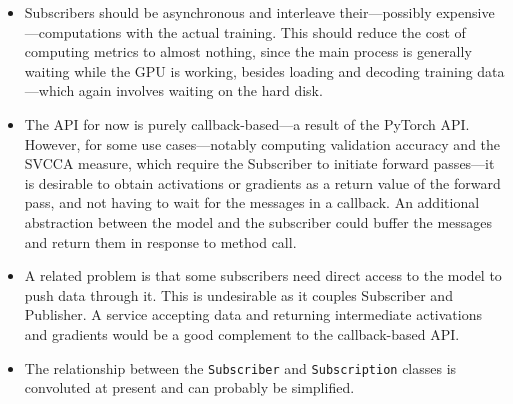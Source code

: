 \begin{itemize}
    \item Subscribers should be asynchronous and interleave their---possibly
        expensive---computations with the actual training. This should reduce
        the cost of computing metrics to almost nothing, since the main process
        is generally waiting while the GPU is working, besides loading and
        decoding training data---which again involves waiting on the hard disk.
    \item The API for now is purely callback-based---a result of the PyTorch
        API. However, for some use cases---notably computing validation
        accuracy and the SVCCA measure, which require the Subscriber to initiate
        forward passes---it is desirable to obtain activations or gradients as
        a return value of the forward pass, and not having to wait for the
        messages in a callback. An additional abstraction between the model and
        the subscriber could buffer the messages and return them in response to
        method call.
    \item A related problem is that some subscribers need direct access to the
        model to push data through it. This is undesirable as it couples
        Subscriber and Publisher. A service accepting data and returning
        intermediate activations and gradients would be a good complement to the
        callback-based API.
    \item The relationship between the \texttt{Subscriber} and
        \texttt{Subscription} classes is convoluted at present and can probably
        be simplified.
\end{itemize}
